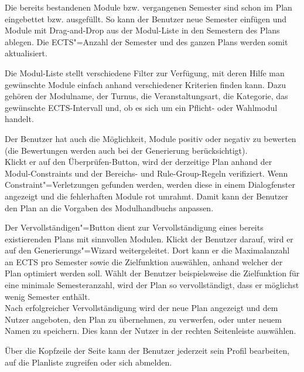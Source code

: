 Die bereits bestandenen Module bzw. vergangenen Semester sind schon im Plan eingebettet bzw. ausgefüllt.
So kann der Benutzer neue Semester einfügen und Module mit Drag-and-Drop aus der Modul-Liste in den Semestern des Plans ablegen. Die ECTS"=Anzahl der Semester und des ganzen Plans werden somit aktualisiert. 

Die Modul-Liste stellt verschiedene Filter zur Verfügung, mit deren Hilfe man gewünschte Module einfach anhand verschiedener Kriterien finden kann.
Dazu gehören der Modulname, der Turnus, die Veranstaltungsart, die Kategorie, das gewünschte ECTS-Intervall und, ob es sich um ein Pflicht- oder Wahlmodul handelt.

Der Benutzer hat auch die Möglichkeit, Module positiv oder negativ zu bewerten (die Bewertungen werden auch bei der Generierung berücksichtigt).\\
Klickt er auf den Überprüfen-Button, wird der derzeitige Plan anhand der Modul-Constraints und der Bereichs- und Rule-Group-Regeln verifiziert. Wenn Constraint"=Verletzungen gefunden werden, werden diese in einem Dialogfenster angezeigt und die fehlerhaften Module rot umrahmt. Damit kann der Benutzer den Plan an die Vorgaben des Modulhandbuchs anpassen.

Der Vervollständigen"=Button dient zur Vervollständigung eines bereits existierenden Plans mit sinnvollen Modulen. Klickt der Benutzer darauf, wird er auf den Generierungs"=Wizard weitergeleitet. Dort kann er die Maximalanzahl an ECTS pro Semester sowie die Zielfunktion auswählen, anhand welcher der Plan optimiert werden soll. Wählt der Benutzer beispielsweise die Zielfunktion für eine minimale Semesteranzahl, wird der Plan so vervollständigt, dass er möglichst wenig Semester enthält.   \\
Nach erfolgreicher Vervollständigung wird der neue Plan angezeigt und dem Nutzer angeboten, den Plan zu übernehmen, zu verwerfen, oder unter neuem Namen zu speichern. Dies kann der Nutzer in der rechten Seitenleiste auswählen. 

Über die Kopfzeile der Seite kann der Benutzer jederzeit sein Profil bearbeiten, auf die Planliste zugreifen oder sich abmelden.